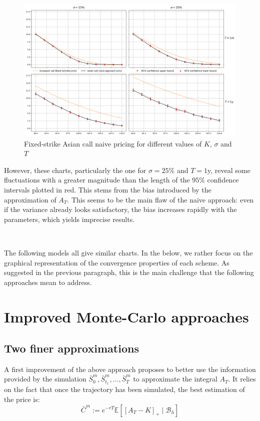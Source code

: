 \documentclass{article}
\begin{document}
\begin{figure}[H]
  \hspace*{-0.02\linewidth}\includegraphics[width=1.065\textwidth]{charts/prices.png}
  \caption{Fixed-strike Asian call naive pricing for different values of $K$, $\sigma$ and $T$}
\end{figure}

However, these charts, particularly the one for $\sigma = 25\%$ and $T=1$y, reveal some fluctuations with
a greater magnitude than the length of the $95\%$ confidence intervals plotted in red. This stems from the bias
introduced by the approximation of $A_T$. This seems to be the main flaw of the
naive approach: even if the variance already looks satisfactory, the bias increases rapidly with the parameters, which
yields imprecise results.

\

The following models all give similar charts. In the below, we rather focus on the graphical representation
of the convergence properties of each scheme. As suggested in the previous paragraph, this is
the main challenge that the following approaches mean to address.

\section{Improved Monte-Carlo approaches}
\subsection{Two finer approximations}

A first improvement of the above approach proposes to better use the information provided by the simulation
$\bar S_0^m, \bar S_{t_1}^m, \dots, \bar S_T^m$ to approximate the integral $A_T$.
It relies on the fact that once the trajectory has been simulated, the best estimation of the price is:
\[
	\bar C^m := e^{-rT} \mathbb E \left[ \left[ A_T - K \right]_+ \mid \mathcal B_h \right]
\]
\end{document}
